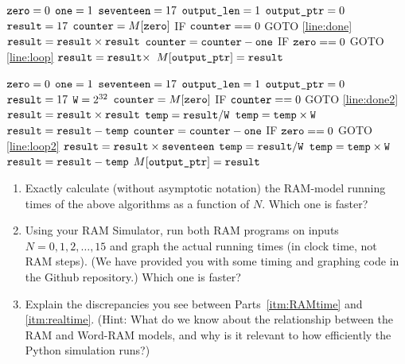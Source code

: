 \documentclass[11pt]{article}
\begin{document}
\begin{enumerate}
\begin{algorithm}[H]
\setcounter{AlgoLine}{-1}
$\texttt{zero} = 0$\;
$\texttt{one} = 1$\;
$\texttt{seventeen} = 17$\;
$\texttt{output\_len} = 1$\;
$\texttt{output\_ptr} = 0$\;
$\texttt{result} = 17$\;
$\texttt{counter} = M[\texttt{zero}]$\;
\Indp
 IF $\texttt{counter} == 0$ GOTO \ref{line:done}\; \label{line:loop}
$\texttt{result} = \texttt{result} \times \texttt{result}$\;
$\texttt{counter} = \texttt{counter} - \texttt{one}$\;
IF $\texttt{zero} == 0$ GOTO \ref{line:loop}\;
\Indm
$\texttt{result} = \texttt{result} \times $\seventeen\; \label{line:done}
$M[\texttt{output\_ptr}]=\texttt{result}$\;
\end{algorithm}

\begin{algorithm}[H]
\setcounter{AlgoLine}{-1}
$\texttt{zero} = 0$\;
$\texttt{one} = 1$\;
$\texttt{seventeen} = 17$\;
$\texttt{output\_len} = 1$\;
$\texttt{output\_ptr} = 0$\;
$\texttt{result} = 17$\;
$\texttt{W} = 2^{32}$\;
$\texttt{counter} = M[\texttt{zero}]$\;
\Indp
IF $\texttt{counter} == 0$ GOTO \ref{line:done2}\; \label{line:loop2}
$\texttt{result} = \texttt{result} \times \texttt{result}$\;
$\texttt{temp} = \texttt{result} / \texttt{W}$\;
$\texttt{temp} = \texttt{temp} \times \texttt{W}$\;
$\texttt{result} = \texttt{result} - \texttt{temp}$\;
$\texttt{counter} = \texttt{counter} - \texttt{one}$\;
IF $\texttt{zero} == 0$ GOTO \ref{line:loop2}\;
\Indm
$\texttt{result} = \texttt{result} \times \texttt{seventeen}$\;
\label{line:done2}
$\texttt{temp} = \texttt{result} / \texttt{W}$\;
$\texttt{temp} = \texttt{temp} \times \texttt{W}$\;
$\texttt{result} = \texttt{result} - \texttt{temp}$\;
$M[\texttt{output\_ptr}]=\texttt{result}$\; 
\end{algorithm}


\begin{enumerate}
    \item Exactly calculate (without asymptotic notation) the RAM-model running times of the above algorithms as a function of $N$.
    Which one is faster? \label{itm:RAMtime}    
    \item Using your RAM Simulator, run both RAM programs on inputs $N=0,1,2,\ldots,15$ and graph the actual running times (in clock time, not RAM steps).  (We have provided you with some timing and graphing code in the Github repository.) Which one is faster?  \label{itm:realtime}  
    
    \item Explain the discrepancies you see between Parts~\ref{itm:RAMtime} and \ref{itm:realtime}.  (Hint: What do we know about the relationship between the RAM and Word-RAM models, and why is it relevant to how efficiently the Python simulation runs?) 
    

\end{enumerate}
\end{enumerate}
\end{document}
